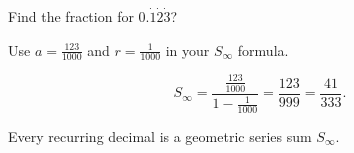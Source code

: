 \begin{problem}
Find the fraction for $0.\dot{1}\dot{2}\dot{3}$?
\end{problem}
\begin{hint}
Use $a = \frac{123}{1000}$ and $r = \frac{1}{1000}$ in your $S_\infty$ formula.
\end{hint}
\begin{solution}
\[
S_\infty = \frac{\frac{123}{1000}}{1 - \frac{1}{1000}} = \frac{123}{999} = \frac{41}{333}.
\]
\end{solution}
\begin{takeaways}
\item Every recurring decimal is a geometric series sum $S_\infty$.
\end{takeaways}
